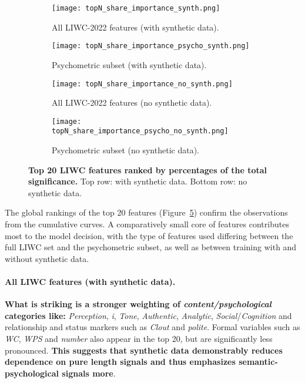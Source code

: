 \begin{figure}[H]
  \centering
  
  \begin{subfigure}[t]{0.49\textwidth}
    \centering
    \texttt{[image: topN\_share\_importance\_synth.png]}
    \caption{All LIWC-2022 features (with synthetic data).}
    \label{fig:synth_all}
  \end{subfigure}\hfill
  \begin{subfigure}[t]{0.49\textwidth}
    \centering
    \texttt{[image: topN\_share\_importance\_psycho\_synth.png]}
    \caption{Psychometric subset (with synthetic data).}
    \label{fig:synth_psycho}
  \end{subfigure}
  
  \vspace{0.5cm}
  

  \begin{subfigure}[t]{0.49\textwidth}
    \centering
    \texttt{[image: topN\_share\_importance\_no\_synth.png]}
    \caption{All LIWC-2022 features (no synthetic data).}
    \label{fig:no_synth_all}
  \end{subfigure}\hfill
  \begin{subfigure}[t]{0.49\textwidth}
    \centering
    \texttt{[image: topN\_share\_importance\_psycho\_no\_synth.png]}
    \caption{Psychometric subset (no synthetic data).}
    \label{fig:no_synth_psycho}
  \end{subfigure}

  \caption[Top 20 LIWC features ranked by percentages of the total significance.]{\textbf{Top 20 LIWC features ranked by percentages of the total significance.} 
  Top row: with synthetic data. Bottom row: no synthetic data.}
  \label{fig:global_feature_importance_combined}
\end{figure}

The global rankings of the top 20 features (Figure~\ref{fig:global_feature_importance_combined}) confirm the observations from the cumulative curves. A comparatively small core of features contributes most to the model decision, with the type of features used differing between the full LIWC set and the psychometric subset, as well as between training with and without synthetic data.

\paragraph{All LIWC features (with synthetic data).}
\textbf{What is striking is a stronger weighting of \emph{content/psychological} categories like:} \textit{Perception}, \textit{i}, \textit{Tone}, \textit{Authentic}, \textit{Analytic}, \textit{Social}/\textit{Cognition} and relationship and status markers such as \textit{Clout} and \textit{polite}. Formal variables such as \textit{WC}, \textit{WPS} and \textit{number} also appear in the top 20, but are significantly less pronounced. \textbf{This suggests that synthetic data demonstrably reduces dependence on pure length signals and thus emphasizes semantic-psychological signals more}.

